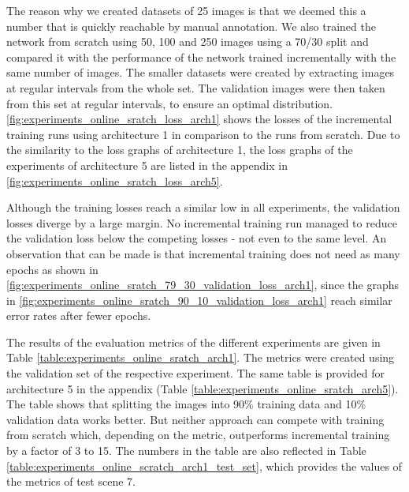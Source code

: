 The reason why we created datasets of 25 images is that we deemed this a number that is quickly reachable by manual annotation. We also trained the network from scratch using 50, 100 and 250 images using a 70/30 split and compared it with the performance of the network trained incrementally with the same number of images. The smaller datasets were created by extracting images at regular intervals from the whole set. The validation images were then taken from this set at regular intervals, to ensure an optimal distribution. \fig \ref{fig:experiments_online_sratch_loss_arch1} shows the losses of the incremental training runs using architecture 1 in comparison to the runs from scratch. Due to the similarity to the loss graphs of architecture 1, the loss graphs of the experiments of architecture 5 are listed in the appendix in \fig \ref{fig:experiments_online_sratch_loss_arch5}.

Although the training losses reach a similar low in all experiments, the validation losses diverge by a large margin. No incremental training run managed to reduce the validation loss below the competing losses - not even to the same level. An observation that can be made is that incremental training does not need as many epochs as shown in \fig \ref{fig:experiments_online_sratch_79_30_validation_loss_arch1}, since the graphs in \fig \ref{fig:experiments_online_sratch_90_10_validation_loss_arch1} reach similar error rates after fewer epochs. 

The results of the evaluation metrics of the different experiments are given in Table \ref{table:experiments_online_sratch_arch1}. The metrics were created using the validation set of the respective experiment. The same table is provided for architecture 5 in the appendix (Table \ref{table:experiments_online_sratch_arch5}). The table shows that splitting the images into 90\% training data and 10\% validation data works better. But neither approach can compete with training from scratch which, depending on the metric, outperforms incremental training by a factor of 3 to 15. The numbers in the table are also reflected in Table \ref{table:experiments_online_scratch_arch1_test_set}, which provides the values of the metrics of test scene 7.


